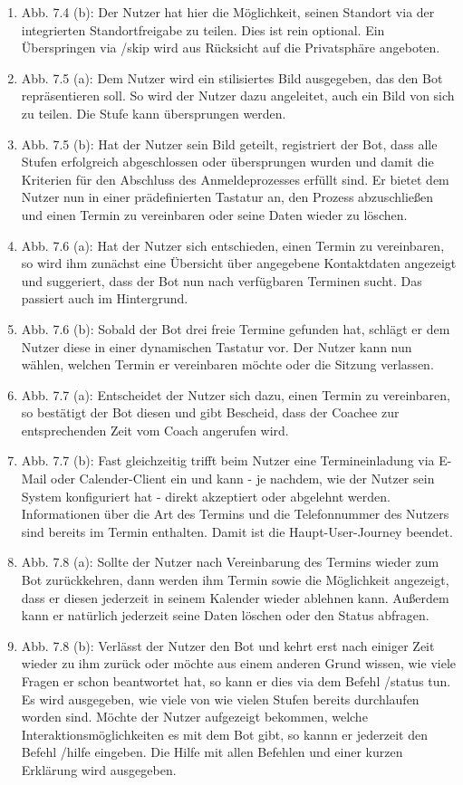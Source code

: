 \begin{enumerate}
		\item Abb. 7.4 (b): Der Nutzer hat hier die Möglichkeit, seinen Standort via der integrierten Standortfreigabe zu teilen. Dies ist rein optional. Ein Überspringen via /skip wird aus Rücksicht auf die Privatsphäre angeboten. 
		\item Abb. 7.5 (a): Dem Nutzer wird ein stilisiertes Bild ausgegeben, das den Bot repräsentieren soll. So wird der Nutzer dazu angeleitet, auch ein Bild von sich zu teilen. Die Stufe kann übersprungen werden.
		\item Abb. 7.5 (b): Hat der Nutzer sein Bild geteilt, registriert der Bot, dass alle Stufen erfolgreich abgeschlossen oder übersprungen wurden und damit die Kriterien für den Abschluss des Anmeldeprozesses erfüllt sind. Er bietet dem Nutzer nun in einer prädefinierten Tastatur an, den Prozess abzuschließen und einen Termin zu vereinbaren oder seine Daten wieder zu löschen.
		\item Abb. 7.6 (a): Hat der Nutzer sich entschieden, einen Termin zu vereinbaren, so wird ihm zunächst eine Übersicht über angegebene Kontaktdaten angezeigt und suggeriert, dass der Bot nun nach verfügbaren Terminen sucht. Das passiert auch im Hintergrund.
		\item Abb. 7.6 (b): Sobald der Bot drei freie Termine gefunden hat, schlägt er dem Nutzer diese in einer dynamischen Tastatur vor. Der Nutzer kann nun wählen, welchen Termin er vereinbaren möchte oder die Sitzung verlassen.
		\item Abb. 7.7 (a): Entscheidet der Nutzer sich dazu, einen Termin zu vereinbaren, so bestätigt der Bot diesen und gibt Bescheid, dass der Coachee zur entsprechenden Zeit vom Coach angerufen wird. 
		\item Abb. 7.7 (b): Fast gleichzeitig trifft beim Nutzer eine Termineinladung via E-Mail oder Calender-Client ein und kann - je nachdem, wie der Nutzer sein System konfiguriert hat - direkt akzeptiert oder abgelehnt werden. Informationen über die Art des Termins und die Telefonnummer des Nutzers sind bereits im Termin enthalten. Damit ist die Haupt-User-Journey beendet.
		\item Abb. 7.8 (a): Sollte der Nutzer nach Vereinbarung des Termins wieder zum Bot zurückkehren, dann werden ihm Termin sowie die Möglichkeit angezeigt, dass er diesen jederzeit in seinem Kalender wieder ablehnen kann. Außerdem kann er natürlich jederzeit seine Daten löschen oder den Status abfragen.
		\item Abb. 7.8 (b): Verlässt der Nutzer den Bot und kehrt erst nach einiger Zeit wieder zu ihm zurück oder möchte aus einem anderen Grund wissen, wie viele Fragen er schon beantwortet hat, so kann er dies via dem Befehl /status tun. Es wird ausgegeben, wie viele von wie vielen Stufen bereits durchlaufen worden sind. Möchte der Nutzer aufgezeigt bekommen, welche Interaktionsmöglichkeiten es mit dem Bot gibt, so kannn er jederzeit den Befehl /hilfe eingeben. Die Hilfe mit allen Befehlen und einer kurzen Erklärung wird ausgegeben.

\end{enumerate}
